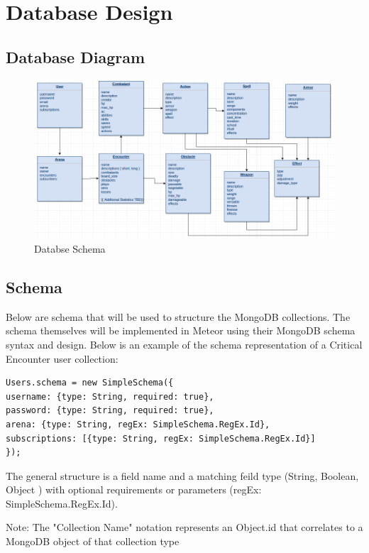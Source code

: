 \documentclass[12pt,a4paper]{report}
\begin{document}
\newpage
\section{Database Design}
\subsection {Database Diagram}
\begin{figure}[h]
	\centering
	\includegraphics[scale=.4]{database_schema}
	\caption{Databse Schema}
	\label{fig: Databse Schema }
\end{figure}
\subsection{Schema}
Below are schema that will be used to structure the MongoDB collections. The schema themselves will be implemented in Meteor using their MongoDB schema syntax and design. Below is an example of the schema representation of a Critical Encounter user collection:

\begin{lstlisting}
Users.schema = new SimpleSchema({
username: {type: String, required: true},
password: {type: String, required: true},
arena: {type: String, regEx: SimpleSchema.RegEx.Id},
subscriptions: [{type: String, regEx: SimpleSchema.RegEx.Id}]
});
\end{lstlisting}

The general structure is a field name and a matching feild type (String, Boolean, Object ) with optional requirements or parameters (regEx: SimpleSchema.RegEx.Id).

Note: The { "Collection Name" } notation represents an Object.id that correlates to a MongoDB object of that collection type
\end{document}
